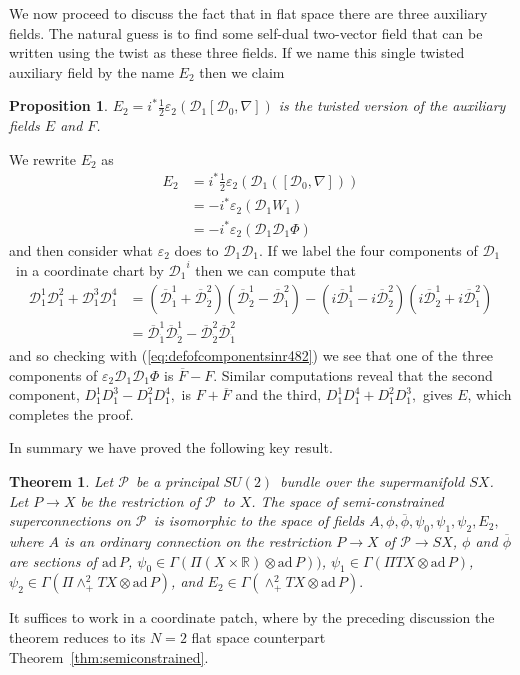 \documentclass[twoside]{amsart}
\newcommand{\RR}{\ensuremath{\mathbb{R}}}
\newtheorem{theorem}{Theorem}
\newtheorem{prop}{Proposition}
\renewcommand{\eqref}[1]{(\ref{eq:#1})}
\newcommand{\thmref}[1]{Theorem~\ref{thm:#1}}
\renewcommand{\epsilon}{\varepsilon}
\newcommand{\enm}[1]{\ensuremath{#1}}
\renewcommand{\bar}[1]{\overline{#1}}
\newcommand{\sut}{\enm{SU(2)}}
\newcommand{\pp}{\enm{\mathcal{P}}}
\newcommand{\ad}{\enm{\mathrm{ad}}}
\renewcommand{\epsilon}{\varepsilon}
\newcommand{\upperlowerabc}[3]{\enm{{#1}^{#2}_{#3}}}
\newcommand{\upperdotlowerabc}[3]{\upperlowerabc{#1}{#2}{\dot{#3}}}
\newcommand{\dudlc}[2]{\upperdotlowerabc{\bar{\mathcal{D}}}{#1}{#2}}
\newcommand{\nab}{\enm{\nabla}}
\newcommand{\doc}{\enm{\mathcal{D}_{1}}}
\newcommand{\dzc}{\enm{\mathcal{D}_{0}}}
\newcommand{\dd}{\enm{\mathcal{D}}}
\newcommand{\adp}{\enm{\ad\,P}}
\begin{document}
We now proceed to discuss the fact that in flat space there are three
auxiliary fields.  The natural guess is to find some self-dual
two-vector field that can be written using the twist as these three
fields.  If we name this single twisted auxiliary field by the name \(
E_{2} \) then we claim
\begin{prop}
    \label{prop:auxiliaryequivalence}
    \( E_{2} = i^{*}\frac{1}{2}\epsilon_{2}(\doc[\dzc,\nab]) \)
is the twisted version of the auxiliary fields \( E \) and \( F \).
\end{prop}
\proof We rewrite \( E_{2} \) as
\begin{align*}
    E_{2} &= i^{*}\frac{1}{2}\epsilon_{2}(\doc([\dzc,\nab])) \\
          &= -i^{*}\epsilon_{2}(\doc W_{1}) \\
            &= -i^{*}\epsilon_{2}(\doc\doc \Phi)
\end{align*}
and then consider what \( \epsilon_{2} \) does to \( \doc\doc. \)  If
we
label the four components of \doc\ in a coordinate chart by \(
\doc^{i}
\) then we can compute that
\begin{align*}
    \dd_{1}^{1}\dd_{1}^{2}+\dd_{1}^{3}\dd_{1}^{4} &=
       (\dudlc{1}{1} + \dudlc{2}{2})(\dudlc{1}{2} - \dudlc{2}{1})
      -(i\dudlc{1}{1} - i\dudlc{2}{2})(i\dudlc{1}{2} + i\dudlc{2}{1}) \\
      &= \dudlc{1}{1}\dudlc{1}{2} - \dudlc{2}{2}\dudlc{2}{1}
\end{align*}
and so checking with \eqref{defofcomponentsinr482} we see that one of
the three components of \( \epsilon_{2}\doc\doc\Phi \) is \(
\bar{F}-F.
\)  Similar computations reveal that the second component, \(
D_{1}^{1}D_{1}^{3}-D_{1}^{2}D_{1}^{4}, \) is \(
F+\bar{F} \) and the third, \( D_{1}^{1}D_{1}^{4}+D_{1}^{2}D_{1}^{3},
\) gives \( E \), which completes the proof.

In summary we have proved the following key result.
\begin{theorem}
    Let \pp\ be a principal \sut\ bundle over the supermanifold \( SX
    \).  Let \( P\to X \) be the restriction of \pp\ to \( X \).
    The space of semi-constrained superconnections on \pp\ is
    isomorphic to the space of fields \( A, \phi, \bar{\phi},
    \psi_{0}, \psi_{1}, \psi_{2}, E_{2}, \) where \( A \) is an
    ordinary connection on the restriction \( P\to X \) of \( \pp\to
SX
    \),  \( \phi \) and \( \bar{\phi} \)  are sections of \( \adp
    \), \( \psi_{0} \in \Gamma(\Pi(X\times\RR)\otimes\adp)) \), \(
    \psi_{1} \in \Gamma(\Pi TX\otimes\adp) \), \(
    \psi_{2} \in \Gamma(\Pi\wedge^{2}_{+}TX\otimes\adp)
    \), and \( E_{2}\in \Gamma(\wedge^{2}_{+}TX\otimes\adp). \)
\end{theorem}
\proof It suffices to work in a coordinate patch, where by the
preceding discussion the theorem reduces to its \( N=2 \) flat space
counterpart \thmref{semiconstrained}.
\end{document}
